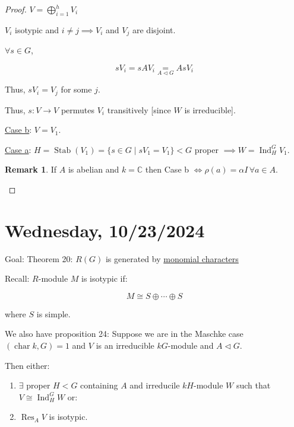 \documentclass{article}
\theoremstyle{definition}
\newtheorem*{remark}{Remark}
\begin{document}
\begin{proof}
    \(V = \bigoplus_{i=1}^h V_i\) 

    \(V_i\) isotypic and \(i \neq j \implies V_i\) and \(V_j\) are disjoint.

    \(\forall s\in G\),

    \[
        s V_i = sA V_i \underset{A \triangleleft G}{=} As V_i
    \]

    Thus, \(s V_i = V_j\) for some \(j\).

    Thus, \(s: V \to V\) permutes \(V_i\) transitively [since \(W\) is irreducible].

    \underline{Case b}: \(V = V_1\).  

    \underline{Case a}: \(H = \operatorname{Stab}(V_1) = \{ s\in G \mid s V_1 = V_1 \} < G\) proper \(\implies W = \operatorname{Ind}_H^G V_1\).

    \begin{remark}
        If \(A\) is abelian and \(k=\mathbb{C}\) then Case b \(\iff \rho(a) = \alpha I\, \forall a\in A\).
    \end{remark}

\end{proof}

\section*{Wednesday, 10/23/2024}

Goal: Theorem 20: \(R(G)\) is generated by \underline{monomial characters}

Recall: \(R\)-module \(M\) is isotypic if:

\[
    M \cong S \oplus \cdots \oplus S
\]

where \(S\) is simple.

We also have proposition 24: Suppose we are in the Maschke case \((\operatorname{char} k, G) = 1\) and \(V\) is an irreducible \(kG\)-module and \(A \triangleleft G\).

Then either:

\begin{enumerate}[label=\alph*)]
    \item \(\exists\) proper \(H < G\) containing \(A\) and irreducile \(kH\)-module \(W\) such that \(V \cong \operatorname{Ind}_H^G W\) or:
    
    \item \(\operatorname{Res}_A V\) is isotypic.
\end{enumerate} 
\end{document}
